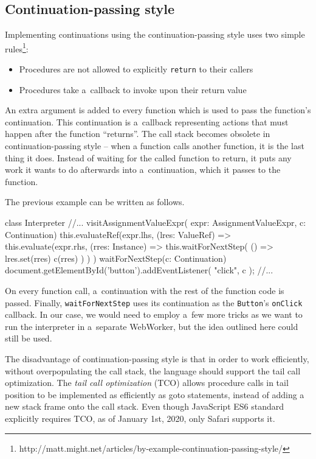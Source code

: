 \subsection*{Continuation-passing style}
\label{chap4:continuations}
Implementing continuations using the continuation-passing style uses two simple rules\footnote{http://matt.might.net/articles/by-example-continuation-passing-style/}:
\begin{itemize}
    \item Procedures are not allowed to explicitly \texttt{return} to their callers
    \item Procedures take a~callback to invoke upon their return value
\end{itemize}
An extra argument is added to every function which is used to pass the function's continuation. This continuation is a~callback
representing actions that must happen after the function ``returns''. The call stack becomes obsolete in continuation-passing style -- when
a function calls another function, it is the last thing it does. Instead of waiting for the called function to return, it puts any work
it wants to do afterwards into a~continuation, which it passes to the function.

The previous example can be written as follows.
\newpage
\begin{code}
class Interpreter {
    //...
    visitAssignmentValueExpr(
        expr: AssignmentValueExpr, c: Continuation) {
        this.evaluateRef(expr.lhs, (lres: ValueRef) => {
            this.evaluate(expr.rhs, (rres: Instance) => {
                this.waitForNextStep(
                    () => {
                        lres.set(rres)
                        c(rres)
                })
            })
        })
    }
    waitForNextStep(c: Continuation) {
        document.getElementById('button').addEventListener(
            "click",
            c
        );
    }
    //...
}
\end{code}

On every function call, a~continuation with the rest of the function code is passed. Finally, \texttt{waitForNextStep} uses its continuation as the \texttt{Button}'s
\texttt{onClick} callback. In our case, we would need to employ a~few more tricks as we want to run the interpreter in a~separate WebWorker, but the idea
outlined here could still be used.

The disadvantage of continuation-passing style is that in order to work efficiently, without overpopulating the call stack, the language should support the tail
call optimization. The \emph{tail call optimization} (TCO) allows procedure calls in tail position to be implemented as efficiently as goto statements, instead of adding
a new stack frame onto the call stack. Even though JavaScript ES6 standard explicitly requires TCO, as of January 1st, 2020, only Safari supports it.

